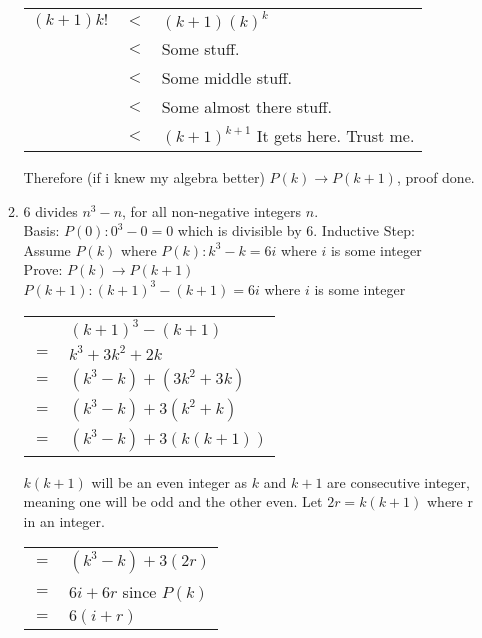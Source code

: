 \begin{enumerate}
\begin{enumerate}
\begin{table}[h]
\centering
\begin{tabular}{rcl}
$(k+1)k!$ & $<$                     & $(k+1)(k)^{k}$                        \\
          & $<$                     & Some stuff.                           \\
          & $<$                     & Some middle stuff.                    \\
	 & $<$ & Some almost there stuff.              \\
          & $<$ & $(k+1)^{k+1}$ It gets here. Trust me.
\end{tabular}
\end{table}


Therefore (if i knew my algebra better) $P(k) \rightarrow P(k+1)$, proof done.\\

\clearpage

\item $6$ divides $n^3 - n$, for all non-negative integers $n$.\\

Basis: $P(0):  0^3 - 0 = 0$ which is divisible by 6.
Inductive Step:\\
Assume $P(k)$ where $P(k): k^3 - k = 6i$ where $i$ is some integer\\
Prove: $P(k) \rightarrow P(k+1)$\\
$P(k+1): (k+1)^3 - (k+1)=6i$ where $i$ is some integer\\

\begin{table}[h]
\centering
\begin{tabular}{cl}
    & $(k+1)^3 - (k+1)$   \\
$=$ & $k^3+3 k^2+2 k$     \\
$=$ & $(k^3-k)+(3k^2+3k)$ \\
$=$ & $(k^3-k)+3(k^2+k)$  \\
$=$ & $(k^3-k)+3(k(k+1))$
\end{tabular}
\end{table}


$k(k+1)$ will be an even integer as $k$ and $k+1$ are consecutive integer, meaning one will be odd and the other even. Let $2r = k(k+1)$ where r in an integer.\\

\begin{table}[h]
\centering
\begin{tabular}{cl}
$=$ & $(k^3-k)+3(2r)$      \\
$=$ & $6i+6r$ since $P(k)$ \\
$=$ & $6(i+r)$            
\end{tabular}
\end{table}


\end{enumerate}
\end{enumerate}
